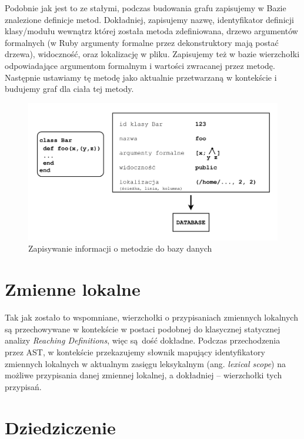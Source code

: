 \documentclass[declaration,shortabstract,mgr]{iithesis}
\begin{document}
Podobnie jak jest to ze stałymi, podczas budowania grafu zapisujemy w Bazie znalezione definicje metod. Dokładniej, zapisujemy nazwę, identyfikator definicji klasy/modułu wewnątrz której została metoda zdefiniowana, drzewo argumentów formalnych (w Ruby argumenty formalne przez dekonstruktory mają postać drzewa), widoczność, oraz lokalizację w pliku. Zapisujemy też w bazie wierzchołki odpowiadające argumentom formalnym i wartości zwracanej przez metodę. Następnie ustawiamy tę metodę jako aktualnie przetwarzaną w kontekście i budujemy graf dla ciała tej metody.


\begin{figure}[htb]
	\centering
	\includegraphics[scale=0.6]{imgs/method.png}
	\caption{Zapisywanie informacji o metodzie do bazy danych}
	\label{fig:build-method}
\end{figure}

\section{Zmienne lokalne}

Tak jak zostało to wspomniane, wierzchołki o przypisaniach zmiennych lokalnych są przechowywane w kontekście w postaci podobnej do klasycznej statycznej analizy \textit{Reaching Definitions}, więc są dość dokładne. Podczas przechodzenia przez AST, w kontekście przekazujemy słownik mapujący identyfikatory zmiennych lokalnych w aktualnym zasięgu leksykalnym (ang. \emph{lexical scope}) na możliwe przypisania danej zmiennej lokalnej, a dokładniej -- wierzchołki tych przypisań.



\section{Dziedziczenie}
\end{document}

